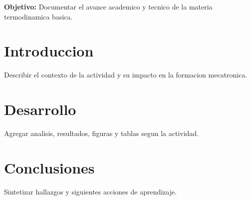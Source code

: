 \documentclass[spanish,letterpaper,oneside]{article}
\begin{document}
\templatePortrait
\templatePagecfg
\onehalfspacing

\begin{abstractd}
\textbf{Objetivo:} Documentar el avance academico y tecnico de la materia termodinamica basica.
\end{abstractd}

\templateIndex
\templateFinalcfg

\section{Introduccion}
Describir el contexto de la actividad y su impacto en la formacion mecatronica.

\section{Desarrollo}
Agregar analisis, resultados, figuras y tablas segun la actividad.

\section{Conclusiones}
Sintetizar hallazgos y siguientes acciones de aprendizaje.



\end{document}

